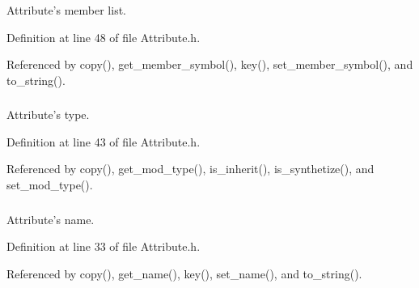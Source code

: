 Attribute's member list. 



Definition at line 48 of file Attribute.h.

Referenced by copy(), get\_\-member\_\-symbol(), key(), set\_\-member\_\-symbol(), and to\_\-string().\hypertarget{classgenevalmag_1_1Attribute_cd49e385c2137cf59f4ab5eec1a5b4d3}{
\subsubsection[{a\_\-mod\_\-type}]{}}
\label{classgenevalmag_1_1Attribute_cd49e385c2137cf59f4ab5eec1a5b4d3}


Attribute's type. 



Definition at line 43 of file Attribute.h.

Referenced by copy(), get\_\-mod\_\-type(), is\_\-inherit(), is\_\-synthetize(), and set\_\-mod\_\-type().\hypertarget{classgenevalmag_1_1Attribute_bae18584e82c30495a4ecb959f46921b}{
\subsubsection[{a\_\-name}]{}}
\label{classgenevalmag_1_1Attribute_bae18584e82c30495a4ecb959f46921b}


Attribute's name. 



Definition at line 33 of file Attribute.h.

Referenced by copy(), get\_\-name(), key(), set\_\-name(), and to\_\-string().\hypertarget{classgenevalmag_1_1Attribute_869f6c4c44a1e1513059a7dd26e56266}{
\subsubsection[{a\_\-sort\_\-type}]{}}
\label{classgenevalmag_1_1Attribute_869f6c4c44a1e1513059a7dd26e56266}


